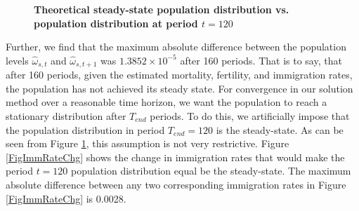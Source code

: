 \documentclass[letterpaper,12pt]{article}
\theoremstyle{definition}
\begin{document}
    \begin{figure}[htbp]\centering \captionsetup{width=4.0in}
      \caption{\label{FigOrigVsFixSSpop}\textbf{Theoretical steady-state population distribution vs. population distribution at period $t=120$}}
    \end{figure}

    Further, we find that the maximum absolute difference between the population levels $\hat{\omega}_{s,t}$ and $\hat{\omega}_{s,t+1}$ was $1.3852\times 10^{-5}$ after 160 periods. That is to say, that after 160 periods, given the estimated mortality, fertility, and immigration rates, the population has not achieved its steady state. For convergence in our solution method over a reasonable time horizon, we want the population to reach a stationary distribution after $T_{end}$ periods. To do this, we artificially impose that the population distribution in period $T_{end}=120$ is the steady-state. As can be seen from Figure \ref{FigOrigVsFixSSpop}, this assumption is not very restrictive. Figure \ref{FigImmRateChg} shows the change in immigration rates that would make the period $t=120$ population distribution equal be the steady-state. The maximum absolute difference between any two corresponding immigration rates in Figure \ref{FigImmRateChg} is 0.0028.
\end{document}
